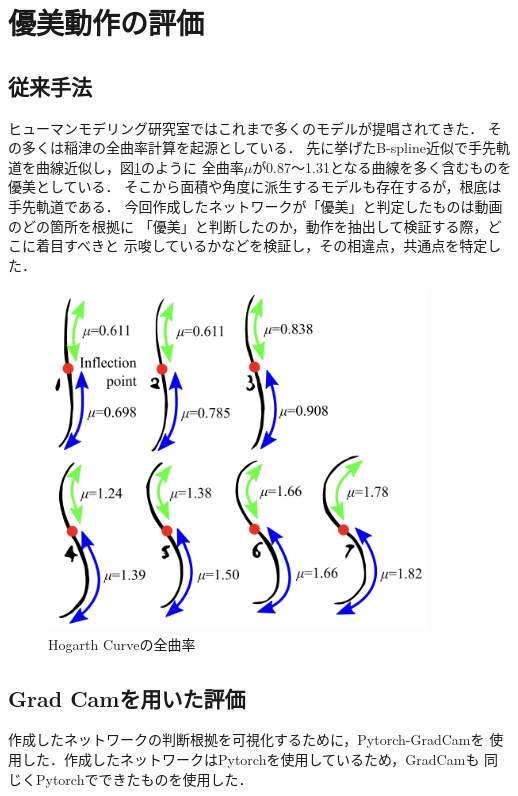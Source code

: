 \section{優美動作の評価}

\subsection{従来手法}
ヒューマンモデリング研究室ではこれまで多くのモデルが提唱されてきた．
その多くは稲津\cite{inazu2}の全曲率計算を起源としている．
先に挙げたB-spline近似で手先軌道を曲線近似し，図\ref{curves}のように
全曲率$\mu$が0.87〜1.31となる曲線を多く含むものを優美としている．
そこから面積や角度に派生するモデルも存在するが，根底は手先軌道である．
今回作成したネットワークが「優美」と判定したものは動画のどの箇所を根拠に
「優美」と判断したのか，動作を抽出して検証する際，どこに着目すべきと
示唆しているかなどを検証し，その相違点，共通点を特定した．

\begin{figure}[b]
  \begin{center}
    \includegraphics[width=100mm]{images/quote/curves.png}
  \end{center}
  \caption{Hogarth Curveの全曲率}
  \label{curves}
\end{figure}

\subsection{Grad Camを用いた評価}
作成したネットワークの判断根拠を可視化するために，Pytorch-GradCam\cite{pygradcam}を
使用した．作成したネットワークはPytorch\cite{pytorch}を使用しているため，GradCamも
同じくPytorchでできたものを使用した．

